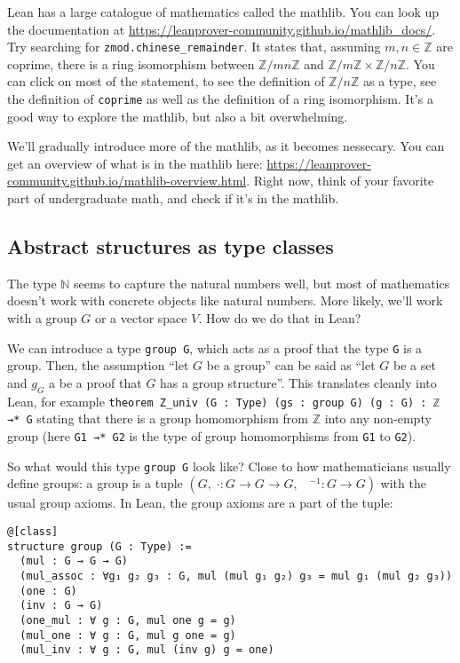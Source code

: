 \documentclass[a4paper, 12pt]{article}
\newcommand{\N}{\mathbb{N}}
\newcommand{\Z}{\mathbb{Z}}
\newcommand{\lean}[1]{\texttt{#1}}
\theoremstyle{changedot}
\theoremstyle{changedotbreak}
\theoremstyle{nonumberplain}
\begin{document}
Lean has a large catalogue of mathematics called the mathlib. You can look up the documentation at {\footnotesize \url{https://leanprover-community.github.io/mathlib_docs/}}. Try searching for \lean{zmod.chinese_remainder}. It states that, assuming $m, n \in \Z$ are coprime, there is a ring isomorphism between $\Z/mn\Z$ and $\Z/m\Z \times \Z/n\Z$. You can click on most of the statement, to see the definition of $\Z/n\Z$ as a type, see the definition of \lean{coprime} as well as the definition of a ring isomorphism. It's a good way to explore the mathlib, but also a bit overwhelming.

We'll gradually introduce more of the mathlib, as it becomes nessecary. You can get an overview of what is in the mathlib here: {\footnotesize \url{https://leanprover-community.github.io/mathlib-overview.html}}. Right now, think of your favorite part of undergraduate math, and check if it's in the mathlib.

\subsection{Abstract structures as type classes}
The type $\N$ seems to capture the natural numbers well, but most of mathematics doesn't work with concrete objects like natural numbers. More likely, we'll work with a group $G$ or a vector space $V$. How do we do that in Lean?

We can introduce a type \lean{group G}, which acts as a proof that the type \lean{G} is a group. Then, the assumption ``let $G$ be a group'' can be said as ``let $G$ be a set and $g_{G}$ a be a proof that $G$ has a group structure''. This translates cleanly into Lean, for example \lean{theorem Z_univ (G : Type) (gs : group G) (g : G)  : ℤ →* G} stating that there is a group homomorphism from $\Z$ into any non-empty group (here \lean{G1 →* G2} is the type of group homomorphisms from \lean{G1} to \lean{G2}).

So what would this type \lean{group G} look like? Close to how mathematicians usually define groups: a group is a tuple $(G,\; \cdot : G \to G \to G,\;\;\; ^{-1} : G \to G)$ with the usual group axioms. In Lean, the group axioms are a part of the tuple:

\begin{verbatim}
@[class]
structure group (G : Type) :=
  (mul : G → G → G)
  (mul_assoc : ∀g₁ g₂ g₃ : G, mul (mul g₁ g₂) g₃ = mul g₁ (mul g₂ g₃))
  (one : G)
  (inv : G → G)
  (one_mul : ∀ g : G, mul one g = g)
  (mul_one : ∀ g : G, mul g one = g)
  (mul_inv : ∀ g : G, mul (inv g) g = one)
\end{verbatim}
\end{document}
